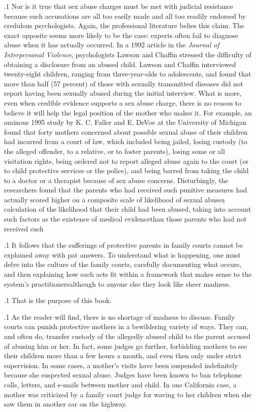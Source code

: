 \documentclass[11pt, twoside]{article}
\begin{document}
{\p.1{%
Nor is it true that sex abuse charges must be met with judicial resistance because such accusations are all too easily made and all too readily
endorsed by credulous psychologists. Again, the professional literature
belies this claim. The exact opposite seems more likely to be the case:
experts often fail to diagnose abuse when it has actually occurred. In a
1992 article in the \textit{Journal of Interpersonal Violence}, psychologists Lawson and Chaffin stressed the difficulty of obtaining a disclosure from an
abused child. Lawson and Chaffin interviewed twenty-eight children,
ranging from three-year-olds to adolescents, and found that more than
half (57 percent) of those with sexually transmitted diseases did not report having been sexually abused during the initial interview.  What is
more, even when credible evidence supports a sex abuse charge, there
is no reason to believe it will help the legal position of the mother who
makes it. For example, an ominous 1995 study by K. C. Faller and E. DeVoe at
the University of Michigan found that forty mothers concerned about
possible sexual abuse of their children had incurred 
from a court of law, which included being jailed, losing custody (to the
alleged offender, to a relative, or to foster parents), losing some or all
visitation rights, being ordered not to report alleged abuse again to the
court (or to child protective services or the police), and being barred
from taking the child to a doctor or a therapist because of sex abuse
concerns. Disturbingly, the researchers found that the parents who had
received such punitive measures had actually scored higher on a composite scale of likelihood of sexual abuse\mdash{}a calculation of the likelihood
that their child had been abused, taking into account such factors as the
existence of medical evidence\mdash{}than those parents who had not received
such 
}%

\p.1{%
It follows that the sufferings of protective parents in family courts
cannot be explained away with pat answers. To understand what is happening, one must delve into the culture of the family courts, carefully
documenting what occurs, and then explaining how such acts fit within
a framework that makes sense to the system’s practitioners\mdash{}although
to anyone else they look like sheer madness.
}%

\p.1{%
That is the purpose of this book.
}%

\p.1{%
As the reader will find, there is no shortage of madness to discuss. Family courts can punish protective mothers in a bewildering
variety of ways. They can, and often do, transfer custody of the allegedly abused child to the parent accused of abusing him or her. In
fact, some judges go further, forbidding mothers to see their children
more than a few hours a month, and even then only under strict
supervision. In some cases, a mother’s visits have been suspended indefinitely because she suspected sexual abuse. Judges have been known
to ban telephone calls, letters, and e-mails between mother and child.
In one California case, a mother was criticized by a family court judge
for waving to her children when she saw them in another car on the
highway.
}%

}
\end{document}
